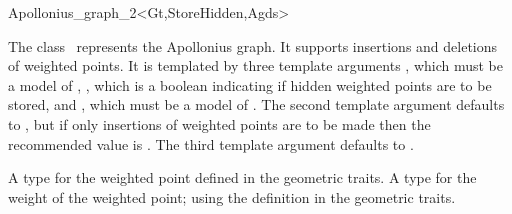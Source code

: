 

\begin{ccRefClass}{Apollonius_graph_2<Gt,StoreHidden,Agds>}

\ccDefinition

The class \ccRefName\ represents the
Apollonius graph. It supports insertions and deletions of weighted
points. It is templated by three template arguments , which
must be a model of , ,
which is a boolean indicating if hidden weighted points are to be
stored, and , which must be a model of
. The second template argument
defaults to , but if only insertions of weighted points are
to be made then the recommended value is . The third template
argument defaults to .


\ccTypes

%
\ccGlue
{}
\ccGlue
{}
\ccGlue
{}
{A type for the weighted point defined in the geometric traits.}
\ccGlue
{}
{A type for the weight of the weighted point; using the definition in
the geometric traits.}
%



\end{ccRefClass}
